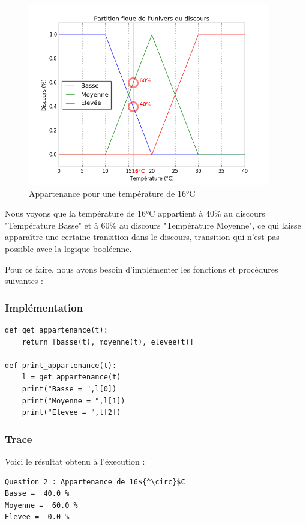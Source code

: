 \documentclass[a4paper]{article}
\begin{document}
\begin{figure}[h]
\begin{center}
	\includegraphics[width=400px]{plot_3_16dC.png}
\end{center}
\caption{Appartenance pour une température de 16°C}
\end{figure}

Nous voyons que la température de 16°C appartient à 40\% au discours "Température Basse" et à 60\% au discours "Température Moyenne", ce qui laisse apparaître une certaine transition dans le discours, transition qui n'est pas possible avec la logique booléenne.

Pour ce faire, nous avons besoin d'implémenter les fonctions et procédures suivantes :

\subsubsection{Implémentation}
\begin{lstlisting}
def get_appartenance(t):
    return [basse(t), moyenne(t), elevee(t)]

def print_appartenance(t):
    l = get_appartenance(t)
    print("Basse = ",l[0])
    print("Moyenne = ",l[1])
    print("Elevee = ",l[2])
\end{lstlisting}

\subsubsection{Trace}
Voici le résultat obtenu à l'éxecution :

\begin{lstlisting}[mathescape]
Question 2 : Appartenance de 16${^\circ}$C
Basse =  40.0 %
Moyenne =  60.0 %
Elevee =  0.0 %
\end{lstlisting}
\end{document}
